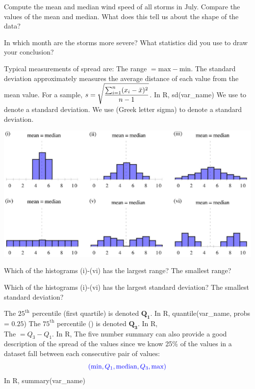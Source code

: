 \ei

\ebox

\bb[resume]
\ii Compute the mean and median wind speed of all storms in July. Compare the values of the mean and median. What does this tell us about the shape of the data? \vfill

\ii In which month are the storms more severe? What statistics did you use to draw your conclusion?  \vfill
\ee


\bbox
Typical measurements of spread are:
\bi
\ii The \alert{range} $= \mbox{max} - \mbox{min}$.
\ii The \alert{standard deviation} approximately measures the average distance of each value from the mean value. 
\bi
\ii[$\circ$] For a sample, $\displaystyle s = \sqrt{\frac{\sum_{i=1}^{n} (x_i - \bar{x})^2}{n-1}}$.
\ii[$\circ$] In R, \alert{sd(var\_name)}
\ii[$\circ$] We use   to denote a \textbf{} standard deviation.
\ii[$\circ$] We use  (Greek letter sigma) to denote a  \textbf{} standard deviation.
\ei
\ei
\ebox

\begin{center}
\includegraphics[width=0.75\tw]{02/fig-compare-sd.png}
\end{center}

\bb[resume]
\ii Which of the histograms (i)-(vi) has the largest range? The smallest range? \vfill

\ii Which of the histograms (i)-(vi) has the largest standard deviation? The smallest standard deviation? \vfill
\ee


\bbox
\bi
\ii  The $25^{\mbox{th}}$ percentile (\alert{first quartile}) is denoted $\mathbf{Q_1}$.  In R, \alert{quantile(var\_name, probs = $0.25$)}
\ii  The $75^{\mbox{th}}$ percentile (\textbf{}) is denoted $\mathbf{Q_3}$.  In R,\\ \textbf{}
 \ii The \textbf{}$=Q_3-Q_1$. In R, \textbf{}
\ii The \alert{five number summary} can also provide a good description of the spread of the values since we know 25\% of the values
in a dataset fall between each consecutive pair of values:
\[  \textcolor{blue}{(\mbox{min}, Q_1 , \mbox{median}, Q_3, \mbox{max} )} \]
 In R, \alert{summary(var\_name)}
\ei
\ebox

